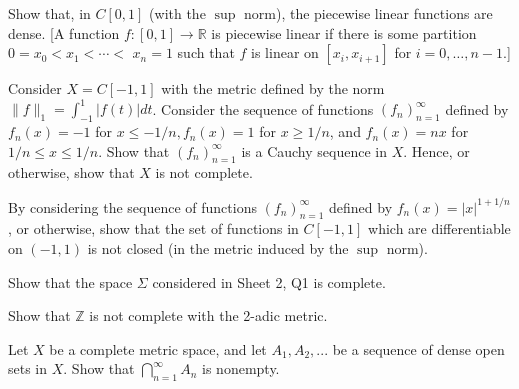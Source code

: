 \documentclass[answers]{exam}
\begin{document}
\begin{questions}
\question%
Show that, in $C[0,1]$ (with the $\sup$ norm), the piecewise linear functions are dense. [A function $f:[0,1] \to \mathbb{R}$ is piecewise linear if there is some partition $0=x_{0}<x_{1}<\cdots<$ $x_{n}=1$ such that $f$ is linear on $\left[x_{i}, x_{i+1}\right]$ for $i=0, \ldots, n-1$.]



\question%
Consider $X=C[-1,1]$ with the metric defined by the norm $\|f\|_{1}=\int_{-1}^{1}|f(t)| d t$. Consider the sequence of functions $\left(f_{n}\right)_{n=1}^{\infty}$ defined by $f_{n}(x)=-1$ for $x \leqslant-1 / n, f_{n}(x)=1$ for $x \geqslant 1 / n$, and $f_{n}(x)=n x$ for $1 / n \leqslant x \leqslant 1 / n$. Show that $\left(f_{n}\right)_{n=1}^{\infty}$ is a Cauchy sequence in $X$. Hence, or otherwise, show that $X$ is not complete.



\question%
By considering the sequence of functions $\left(f_{n}\right)_{n=1}^{\infty}$ defined by $f_{n}(x)=|x|^{1+1 / n}$, or otherwise, show that the set of functions in $C[-1,1]$ which are differentiable on $(-1,1)$ is not closed (in the metric induced by the $\sup$ norm).



\question%
Show that the space $\Sigma$ considered in Sheet 2, Q1 is complete.



\question%
Show that $\mathbb Z$ is not complete with the 2-adic metric.



\question%
Let $X$ be a complete metric space, and let $A_{1}, A_{2}, ...$ be a sequence of dense open sets in $X$. Show that $\bigcap_{n=1}^{\infty} A_{n}$ is nonempty.

\end{questions}
\end{document}
